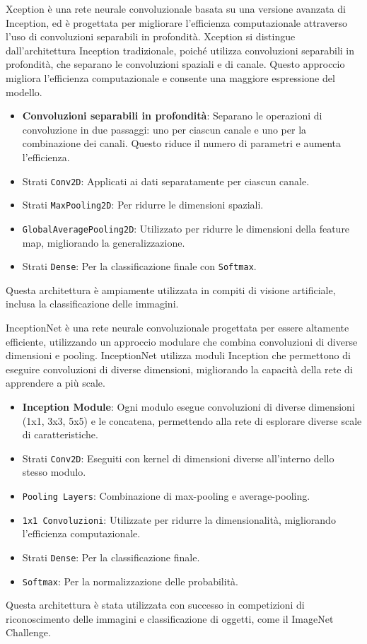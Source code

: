 Xception è una rete neurale convoluzionale basata su una versione avanzata di Inception, ed è progettata per migliorare l'efficienza computazionale attraverso l'uso di convoluzioni separabili in profondità.
Xception si distingue dall'architettura Inception tradizionale, poiché utilizza convoluzioni separabili in profondità, che separano le convoluzioni spaziali e di canale. Questo approccio migliora l'efficienza computazionale e consente una maggiore espressione del modello.
\begin{itemize}
    \item \textbf{Convoluzioni separabili in profondità}: Separano le operazioni di convoluzione in due passaggi: uno per ciascun canale e uno per la combinazione dei canali. Questo riduce il numero di parametri e aumenta l'efficienza.
    \item Strati \texttt{Conv2D}: Applicati ai dati separatamente per ciascun canale.
    \item Strati \texttt{MaxPooling2D}: Per ridurre le dimensioni spaziali.
    \item \texttt{GlobalAveragePooling2D}: Utilizzato per ridurre le dimensioni della feature map, migliorando la generalizzazione.
    \item Strati \texttt{Dense}: Per la classificazione finale con \texttt{Softmax}.
\end{itemize}
Questa architettura è ampiamente utilizzata in compiti di visione artificiale, inclusa la classificazione delle immagini.

InceptionNet è una rete neurale convoluzionale progettata per essere altamente efficiente, utilizzando un approccio modulare che combina convoluzioni di diverse dimensioni e pooling.
InceptionNet utilizza moduli Inception che permettono di eseguire convoluzioni di diverse dimensioni, migliorando la capacità della rete di apprendere a più scale.
\begin{itemize}
    \item \textbf{Inception Module}: Ogni modulo esegue convoluzioni di diverse dimensioni (1x1, 3x3, 5x5) e le concatena, permettendo alla rete di esplorare diverse scale di caratteristiche.
    \item Strati \texttt{Conv2D}: Eseguiti con kernel di dimensioni diverse all'interno dello stesso modulo.
    \item \texttt{Pooling Layers}: Combinazione di max-pooling e average-pooling.
    \item \texttt{1x1 Convoluzioni}: Utilizzate per ridurre la dimensionalità, migliorando l'efficienza computazionale.
    \item Strati \texttt{Dense}: Per la classificazione finale.
    \item \texttt{Softmax}: Per la normalizzazione delle probabilità.
\end{itemize}
Questa architettura è stata utilizzata con successo in competizioni di riconoscimento delle immagini e classificazione di oggetti, come il ImageNet Challenge.

